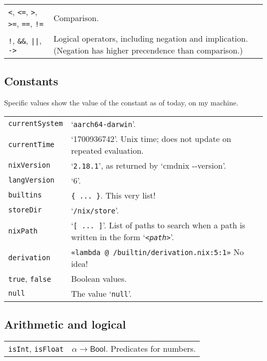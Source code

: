 \documentclass[9pt, a4paper, landscape]{extarticle}
\newcommand{\cmd}[1]{\texttt{#1}}
\newcommand{\bln}{\textsf{Bool}}
\begin{document}
\begin{multicols*}{3}
\begin{tabularx}{\columnwidth}{@{}l>{\raggedright\arraybackslash}X@{}}
  \cmd{<}, \cmd{<=}, \cmd{>}, \cmd{>=}, \cmd{==}, \cmd{!=} &
  Comparison. \\

  \cmd{!}, \cmd{\&\&}, \cmd{||}, \cmd{->} & Logical operators,
  including negation and implication. (Negation has higher precendence
  than comparison.) \\
\end{tabularx}


\columnbreak
\subsection*{Constants}
Specific values show the value of the constant as of today, on my
machine.

\begin{tabularx}{\columnwidth}{@{}l>{\raggedright\arraybackslash}X@{}}
  \cmd{currentSystem} & `\cmd{aarch64-darwin}'. \\
  \cmd{currentTime} & `1700936742'. Unix time; does not update on repeated
  evaluation. \\
  \cmd{nixVersion} & `\cmd{2.18.1}', as returned by `cmd{nix -{}-version}'. \\
  \cmd{langVersion} & `6'. \\
  \cmd{builtins} & \cmd{\{\ ...\ \}}. This very list! \\
  \cmd{storeDir} & `\cmd{/nix/store}'. \\
  \cmd{nixPath} & `\cmd{[\ ...\ ]}'. List of paths to search when a path is
  written in the form `\cmd{<\emph{path}>}'.  \\
  \cmd{derivation} & \cmd{«lambda @ /builtin/derivation.nix:5:1»} No
  idea! \\
  \cmd{true}, \cmd{false} & Boolean values. \\
  \cmd{null} & The value `\cmd{null}'. \\
\end{tabularx}


\subsection*{Arithmetic and logical}

\begin{tabularx}{\columnwidth}{@{}l>{\raggedright\arraybackslash}X@{}}
  \cmd{isInt}, \cmd{isFloat} & $\alpha\to\bln$. Predicates for numbers. \\


\end{tabularx}
\end{multicols*}
\end{document}
